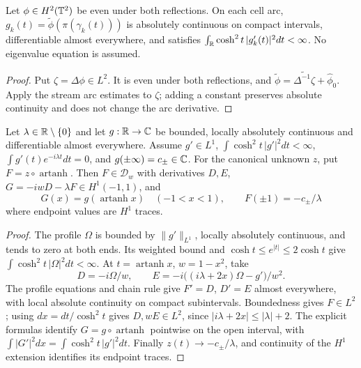 \begin{lemma}
\label{lem:even-h2-arc-regularity}
\leanok
Let $\phi\in H^2(\mathbb{T}^2)$ be even under both reflections. On each cell arc,
$g_k(t)=\widetilde\phi(\pi(\gamma_k(t)))$ is absolutely continuous on
compact intervals, differentiable almost everywhere, and satisfies
$\int_{\mathbb{R}}\cosh^2t\,|g_k'(t)|^2dt<\infty$.
No eigenvalue equation is assumed.
\end{lemma}

\begin{proof}
\leanok
Put $\zeta=\Delta\phi\in L^2$. It is even under both reflections, and
$\widetilde\phi=\widetilde{\Delta^{-1}\zeta}+\hat\phi_0$.
Apply the stream arc estimates to $\zeta$; adding a constant preserves
absolute continuity and does not change the arc derivative.
\end{proof}

\begin{lemma}
\label{lem:canonical-boundary-regularity}
\leanok
Let $\lambda\in\mathbb{R}\setminus\{0\}$ and let $g:\mathbb{R}\to\mathbb{C}$ be bounded,
locally absolutely continuous and differentiable almost everywhere.
Assume $g'\in L^1$, $\int\cosh^2t\,|g'|^2dt<\infty$,
$\int g'(t)e^{-i\lambda t}dt=0$, and $g(\pm\infty)=c_\pm\in\mathbb{C}$.
For the canonical unknown $z$, put $F=z\circ\operatorname{artanh}$.
Then $F\in\mathcal D_w$ with derivatives $D,E$,
$G=-iwD-\lambda F\in H^1(-1,1)$, and
\[
 G(x)=g(\operatorname{artanh}x)\quad(-1<x<1),\qquad
 F(\pm1)=-c_\pm/\lambda
\]
where endpoint values are $H^1$ traces.
\end{lemma}

\begin{proof}
\leanok
The profile $\Omega$ is bounded by $\|g'\|_{L^1}$, locally absolutely
continuous, and tends to zero at both ends. Its weighted bound and
$\cosh t\le e^{|t|}\le2\cosh t$ give $\int\cosh^2t\,|\Omega|^2dt<\infty$.
At $t=\operatorname{artanh}x$, $w=1-x^2$, take
\[
 D=-i\Omega/w,\qquad E=-i\big((i\lambda+2x)\Omega-g'\big)/w^2.
\]
The profile equations and chain rule give $F'=D$, $D'=E$ almost
everywhere, with local absolute continuity on compact subintervals.
Boundedness gives $F\in L^2$; using $dx=dt/\cosh^2t$ gives
$D,wE\in L^2$, since $|i\lambda+2x|\le|\lambda|+2$.
The explicit formulas identify $G=g\circ\operatorname{artanh}$ pointwise
on the open interval, with
$\int|G'|^2dx=\int\cosh^2t\,|g'|^2dt$.
Finally $z(t)\to-c_\pm/\lambda$, and continuity of the $H^1$ extension
identifies its endpoint traces.
\end{proof}


